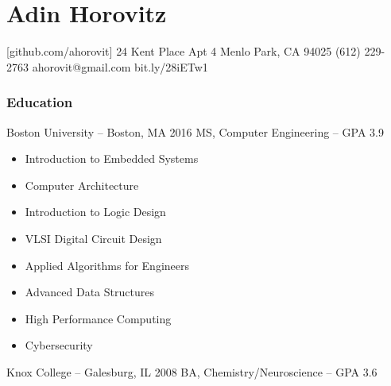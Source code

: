 \documentclass{tccv_AH}
\begin{document}
\sffamily

\part{Adin Horovitz}


\personal
    [github.com/ahorovit]
    {24 Kent Place Apt 4 \newline Menlo Park, CA 94025}
    {(612) 229-2763}
    {ahorovit@gmail.com}
    {bit.ly/28iETw1}


\vspace{-1em}

\section{Education}

\begin{yearlist}

\item[Boston University -- Boston, MA]{2016}
     {MS, Computer Engineering -- GPA 3.9}

\end{yearlist}


\vspace{-2em}
\begin{itemize}
    \itemsep-0.25em
    \itemindent4em
    \item{Introduction to Embedded Systems}
    \item{Computer Architecture}
    \item{Introduction to Logic Design}
    \item{VLSI Digital Circuit Design}
    \item{Applied Algorithms for Engineers}
    \item{Advanced Data Structures}
    \item{High Performance Computing}
    \item{Cybersecurity}

\end{itemize}

\begin{yearlist}

\item[Knox College -- Galesburg, IL]{2008}
     {BA, Chemistry/Neuroscience -- GPA 3.6}

\end{yearlist}
\end{document}
